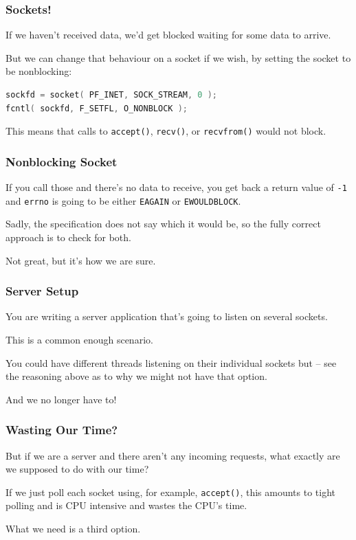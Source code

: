\begin{frame}[fragile]
\frametitle{Sockets!}

If we haven't received data, we'd get blocked waiting for some data to arrive. 

But we can change that behaviour on a socket if we wish, by setting the socket to be nonblocking:

\begin{lstlisting}[language=C]
sockfd = socket( PF_INET, SOCK_STREAM, 0 );
fcntl( sockfd, F_SETFL, O_NONBLOCK );
\end{lstlisting}

This means that calls to \texttt{accept()}, \texttt{recv()}, or \texttt{recvfrom()} would not block.

\end{frame}

\begin{frame}
\frametitle{Nonblocking Socket}

If you call those and there's no data to receive, you get back a return value of \texttt{-1} and \texttt{errno} is going to be either \texttt{EAGAIN} or \texttt{EWOULDBLOCK}. 

Sadly, the specification does not say which it would be, so the fully correct approach is to check for both. 

Not great, but it's how we are sure.

\end{frame}


\begin{frame}
\frametitle{Server Setup}

You are writing a server application that's going to listen on several sockets. 

This is a common enough scenario. 

You could have different threads listening on their individual sockets but -- see the reasoning above as to why we might not have that option. 

And we no longer have to! 

\end{frame}


\begin{frame}
\frametitle{Wasting Our Time?}

But if we are a server and there aren't any incoming requests, what exactly are we supposed to do with our time? 

If we just poll each socket using, for example, \texttt{accept()}, this amounts to tight polling and is CPU intensive and wastes the CPU's time.

What we need is a third option.
\end{frame}


